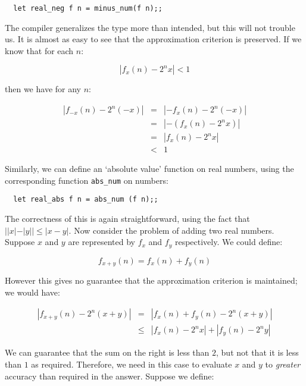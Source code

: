 \begin{boxed}\begin{lstlisting}
  let real_neg f n = minus_num(f n);;
\end{lstlisting}\end{boxed}

The compiler generalizes the type more than intended, but this will not trouble
us. It is almost as easy to see that the approximation criterion is preserved.
If we know that for each $n$:

$$ |f_x(n) - 2^n x| < 1 $$

\noindent then we have for any $n$:

\begin{eqnarray*}
|f_{-x}(n) - 2^n (-x)| & = & |-f_x(n) - 2^n (-x)|       \\
                       & = & |-(f_x(n) - 2^n x)|        \\
                       & = & |f_x(n) - 2^n x|           \\
                       & < & 1
\end{eqnarray*}

Similarly, we can define an `absolute value' function on real numbers, using
the corresponding function {\tt abs\_num} on numbers:

\begin{boxed}\begin{lstlisting}
  let real_abs f n = abs_num (f n);;
\end{lstlisting}\end{boxed}

The correctness of this is again straightforward, using the fact that $||x| -
|y|| \leq |x - y|$. Now consider the problem of adding two real numbers.
Suppose $x$ and $y$ are represented by $f_x$ and $f_y$ respectively. We could
define:

$$ f_{x + y}(n) = f_x(n) + f_y(n) $$

However this gives no guarantee that the approximation criterion is maintained;
we would have:

\begin{eqnarray*}
|f_{x + y}(n) - 2^n (x + y)| & = & |f_x(n) + f_y(n) - 2^n (x + y)|      \\
                             & \leq & |f_x(n) - 2^n x| + |f_y(n) - 2^n y|
\end{eqnarray*}

We can guarantee that the sum on the right is less than $2$, but not that it is
less than $1$ as required. Therefore, we need in this case to evaluate $x$ and
$y$ to {\em greater} accuracy than required in the answer. Suppose we define:

